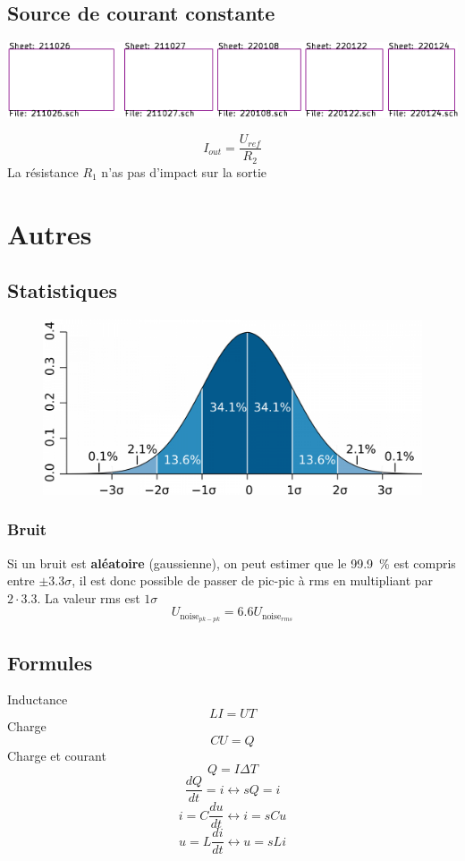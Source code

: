 \documentclass[resume]{subfiles}
\begin{document}
\begin{multicols}{3}
\subsection{Source de courant constante}
\begin{center}
\includegraphics[scale=1,page=25]{../KiCad/resume-crop.pdf}
\end{center}
$$\boxed{I_{out}=\frac{U_{ref}}{R_2}}$$
La résistance $R_1$ n'as pas d'impact sur la sortie

\section{Autres}
\subsection{Statistiques}
\begin{figure}[H]
\centering
\includegraphics[width=0.6\columnwidth]{gauss.png}
\end{figure}
\subsubsection{Bruit}
Si un bruit est \textbf{aléatoire} (gaussienne), on peut estimer que le \SI{99.9}{\percent} est compris entre $\pm 3.3\sigma$, il est donc possible de passer de pic-pic à rms en multipliant par $2\cdot 3.3$. La valeur rms est $1\sigma$
$$U_{\text{noise}_{pk-pk}}=6.6 U_{\text{noise}_{rms}}$$
\columnbreak
\subsection{Formules}
Inductance
$$LI=UT$$
Charge
$$CU=Q$$
Charge et courant
$$Q=I\Delta T$$
$$\frac{dQ}{dt}=i\longleftrightarrow sQ=i$$
$$i=C\frac{du}{dt}\longleftrightarrow i=sCu$$
$$u=L\frac{di}{dt}\longleftrightarrow u=sLi$$





\end{multicols}
\end{document}

